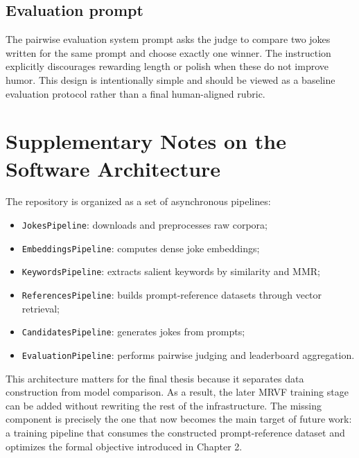 \documentclass[14pt,a4paper]{extreport}
\begin{document}
\section{Evaluation prompt}

The pairwise evaluation system prompt asks the judge to compare two jokes written for the same prompt and choose exactly one winner. The instruction explicitly discourages rewarding length or polish when these do not improve humor. This design is intentionally simple and should be viewed as a baseline evaluation protocol rather than a final human-aligned rubric.

\chapter{Supplementary Notes on the Software Architecture}

The repository is organized as a set of asynchronous pipelines:
\begin{itemize}
  \item \texttt{JokesPipeline}: downloads and preprocesses raw corpora;
  \item \texttt{EmbeddingsPipeline}: computes dense joke embeddings;
  \item \texttt{KeywordsPipeline}: extracts salient keywords by similarity and MMR;
  \item \texttt{ReferencesPipeline}: builds prompt-reference datasets through vector retrieval;
  \item \texttt{CandidatesPipeline}: generates jokes from prompts;
  \item \texttt{EvaluationPipeline}: performs pairwise judging and leaderboard aggregation.
\end{itemize}

This architecture matters for the final thesis because it separates data construction from model comparison. As a result, the later MRVF training stage can be added without rewriting the rest of the infrastructure. The missing component is precisely the one that now becomes the main target of future work: a training pipeline that consumes the constructed prompt-reference dataset and optimizes the formal objective introduced in Chapter 2.
\end{document}
